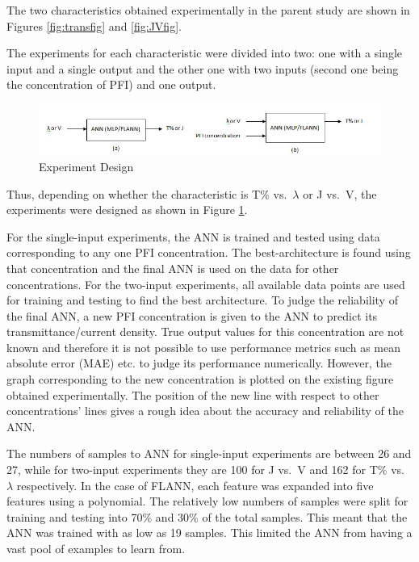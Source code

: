 \documentclass[]{article}
\begin{document}
The two characteristics obtained experimentally in the parent study are shown in Figures \ref{fig:transfig} and \ref{fig:JVfig}.

The experiments for each characteristic were divided into two: one with a single input and a single output and the other one with two inputs (second one being the concentration of PFI) and one output.

\begin{figure}
\centering
\includegraphics[width=1\textwidth,height=\textheight]{images/block.jpg}
\caption{Experiment Design \label{fig:blocks}}
\end{figure}

Thus, depending on whether the characteristic is T\% vs.~\(\lambda\) or J vs.~V, the experiments were designed as shown in Figure \ref{fig:blocks}.

For the single-input experiments, the ANN is trained and tested using data corresponding to any one PFI concentration. The best-architecture is found using that concentration and the final ANN is used on the data for other concentrations. For the two-input experiments, all available data points are used for training and testing to find the best architecture. To judge the reliability of the final ANN, a new PFI concentration is given to the ANN to predict its transmittance/current density. True output values for this concentration are not known and therefore it is not possible to use performance metrics such as mean absolute error (MAE) etc. to judge its performance numerically. However, the graph corresponding to the new concentration is plotted on the existing figure obtained experimentally. The position of the new line with respect to other concentrations' lines gives a rough idea about the accuracy and reliability of the ANN.

The numbers of samples to ANN for single-input experiments are between 26 and 27, while for two-input experiments they are 100 for J vs.~V and 162 for T\% vs.~\(\lambda\) respectively. In the case of FLANN, each feature was expanded into five features using a polynomial. The relatively low numbers of samples were split for training and testing into 70\% and 30\% of the total samples. This meant that the ANN was trained with as low as 19 samples. This limited the ANN from having a vast pool of examples to learn from.
\end{document}
